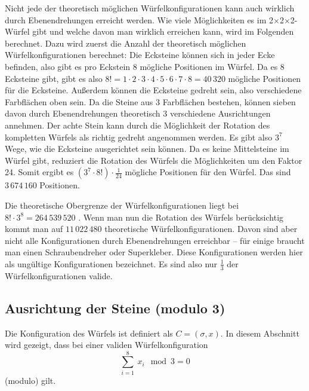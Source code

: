 \documentclass[12pt,a4paper, usenames, dvipsnames]{article}
\newcommand{\Ttwo}{2$\times$2$\times$2-}
\begin{document}
Nicht jede der theoretisch möglichen Würfelkonfigurationen kann auch wirklich durch Ebenendrehungen erreicht werden. Wie viele Möglichkeiten es im \Ttwo Würfel gibt und welche davon man wirklich erreichen kann, wird im Folgenden berechnet. 
Dazu wird zuerst die Anzahl der theoretisch möglichen Würfelkonfigurationen berechnet:
Die Ecksteine können sich in jeder Ecke befinden, also gibt es pro Eckstein 8 mögliche Positionen im Würfel. Da es 8 Ecksteine gibt, gibt es also $8! = 1 \cdot 2 \cdot 3 \cdot 4 \cdot 5 \cdot 6 \cdot 7 \cdot 8 = 40\, 320$ mögliche Positionen für die Ecksteine.
Außerdem können die Ecksteine gedreht sein, also verschiedene Farbflächen oben sein. Da die Steine aus 3 Farbflächen bestehen, können sieben davon durch Ebenendrehungen theoretisch 3 verschiedene Ausrichtungen annehmen. Der achte Stein kann durch die Möglichkeit der Rotation des kompletten Würfels als richtig gedreht angenommen werden. Es gibt also $3^7$ Wege, wie die Ecksteine ausgerichtet sein können.
Da es keine Mittelsteine im Würfel gibt, reduziert die Rotation des Würfels die Möglichkeiten um den Faktor 24. 
Somit ergibt es $(3^7 \cdot 8!) \cdot \frac{1}{24}$ mögliche Positionen für den Würfel. Das sind $3\, 674\, 160$ Positionen.

Die theoretische Obergrenze der Würfelkonfigurationen liegt bei $8! \cdot 3^8 = 264 \, 539 \, 520$ \cite{MMFAA}. Wenn man nun die Rotation des Würfels berücksichtig kommt man auf $11 \, 022 \, 480$ theoretische Würfelkonfigurationen.
Davon sind aber nicht alle Konfigurationen durch Ebenendrehungen erreichbar -- für einige braucht man einen Schraubendreher oder Superkleber. Diese Konfigurationen werden hier als ungültige Konfigurationen bezeichnet. 
Es sind also nur $\frac{1}{3}$ der Würfelkonfigurationen valide.
%
%
%
%
%
%
%
%
%
%
%
%
%
%
%
%
%
%
%
%
\subsection*{Ausrichtung der Steine (modulo 3)}

Die Konfiguration des Würfels ist definiert als $C=(\sigma, x)$. In diesem Abschnitt wird gezeigt, dass bei einer validen Würfelkonfiguration \begin{displaymath}
\sum_{i= 1}^{8} \ x_i \mod 3 = 0 
\end{displaymath}  (modulo) gilt. 
\end{document}

